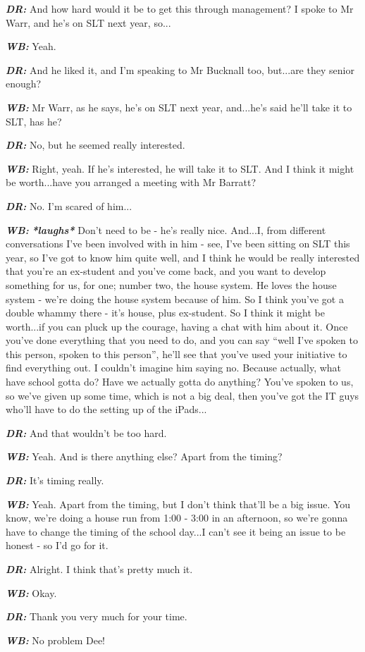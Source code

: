 \textit{\textbf{DR:}} And how hard would it be to get this through management? I spoke to Mr Warr, and he's on SLT next year, so...

\textit{\textbf{WB:}} Yeah.

\textit{\textbf{DR:}} And he liked it, and I'm speaking to Mr Bucknall too, but...are they senior enough?

\textit{\textbf{WB:}} Mr Warr, as he says, he's on SLT next year, and...he's said he'll take it to SLT, has he?

\textit{\textbf{DR:}} No, but he seemed really interested.

\textit{\textbf{WB:}} Right, yeah. If he's interested, he will take it to SLT. And I think it might be worth...have you arranged a meeting with Mr Barratt?

\textit{\textbf{DR:}} No. I'm scared of him...

\textit{\textbf{WB:}} \textit{\textbf{*laughs*}} Don't need to be - he's really nice. And...I, from different conversations I've been involved with in him - see, I've been sitting on SLT this year, so I've got to know him quite well, and I think he would be really interested that you're an ex-student and you've come back, and you want to develop something for us, for one; number two, the house system. He loves the house system - we're doing the house system because of him. So I think you've got a double whammy there - it's house, plus ex-student. So I think it might be worth...if you can pluck up the courage, having a chat with him about it. Once you've done everything that you need to do, and you can say ``well I've spoken to this person, spoken to this person'', he'll see that you've used your initiative to find everything out. I couldn't imagine him saying no. Because actually, what have school gotta do? Have we actually gotta do anything? You've spoken to us, so we've given up some time, which is not a big deal, then you've got the IT guys who'll have to do the setting up of the iPads...

\textit{\textbf{DR:}} And that wouldn't be too hard.

\textit{\textbf{WB:}} Yeah. And is there anything else? Apart from the timing?

\textit{\textbf{DR:}} It's timing really.

\textit{\textbf{WB:}} Yeah. Apart from the timing, but I don't think that'll be a big issue. You know, we're doing a house run from 1:00 - 3:00 in an afternoon, so we're gonna have to change the timing of the school day...I can't see it being an issue to be honest - so I'd go for it.

\textit{\textbf{DR:}} Alright. I think that's pretty much it.

\textit{\textbf{WB:}} Okay.

\textit{\textbf{DR:}} Thank you very much for your time.

\textit{\textbf{WB:}} No problem Dee!

